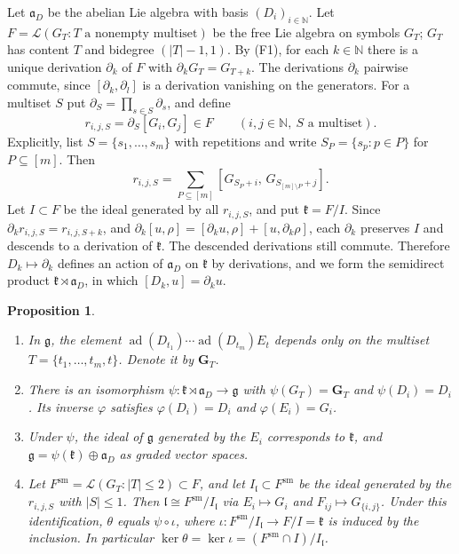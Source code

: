 \documentclass[11pt]{amsart}
\newtheorem{proposition}[theorem]{Proposition}
\theoremstyle{definition}
\theoremstyle{remark}
\newcommand{\N}{\mathbb{N}}
\newcommand{\g}{\mathfrak{g}}
\newcommand{\lie}{\mathfrak{l}}
\newcommand{\kr}{\mathfrak{k}}
\newcommand{\af}{\mathfrak{a}}
\newcommand{\Lf}{\mathcal{L}}
\newcommand{\ad}{\operatorname{ad}}
\begin{document}
Let $\af_D$ be the abelian Lie algebra with basis $(D_i)_{i\in\N}$. Let $F=\Lf(G_T: T\text{ a nonempty multiset})$ be the free Lie algebra on symbols $G_T$; $G_T$ has content $T$ and bidegree $(|T|-1,1)$. By (F1), for each $k\in\N$ there is a unique derivation $\partial_k$ of $F$ with $\partial_kG_T=G_{T+k}$. The derivations $\partial_k$ pairwise commute, since $[\partial_k,\partial_l]$ is a derivation vanishing on the generators. For a multiset $S$ put $\partial_S=\prod_{s\in S}\partial_s$, and define
\[
r_{i,j,S}=\partial_S[G_i,G_j]\in F\qquad(i,j\in\N,\ S\text{ a multiset}).
\]
Explicitly, list $S=\{s_1,\dots,s_m\}$ with repetitions and write $S_P=\{s_p:p\in P\}$ for $P\subseteq[m]$. Then
\begin{equation}\label{eq:r}
r_{i,j,S}=\sum_{P\subseteq[m]}[G_{S_P+i},\,G_{S_{[m]\setminus P}+j}].
\end{equation}
Let $I\subset F$ be the ideal generated by all $r_{i,j,S}$, and put $\kr=F/I$. Since $\partial_kr_{i,j,S}=r_{i,j,S+k}$, and $\partial_k[u,\rho]=[\partial_ku,\rho]+[u,\partial_k\rho]$, each $\partial_k$ preserves $I$ and descends to a derivation of $\kr$. The descended derivations still commute. Therefore $D_k\mapsto\partial_k$ defines an action of $\af_D$ on $\kr$ by derivations, and we form the semidirect product $\kr\rtimes\af_D$, in which $[D_k,u]=\partial_ku$.

\begin{proposition}\label{prop:k}
\begin{enumerate}
\item In $\g$, the element $\ad(D_{t_1})\cdots\ad(D_{t_{m}})E_t$ depends only on the multiset $T=\{t_1,\dots,t_m,t\}$. Denote it by $\mathbf G_T$.
\item There is an isomorphism $\psi\colon\kr\rtimes\af_D\to\g$ with $\psi(G_T)=\mathbf G_T$ and $\psi(D_i)=D_i$. Its inverse $\varphi$ satisfies $\varphi(D_i)=D_i$ and $\varphi(E_i)=G_i$.
\item Under $\psi$, the ideal of $\g$ generated by the $E_i$ corresponds to $\kr$, and $\g=\psi(\kr)\oplus\af_D$ as graded vector spaces.
\item Let $F^{\mathrm{sm}}=\Lf(G_T:|T|\le2)\subset F$, and let $I_{\lie}\subset F^{\mathrm{sm}}$ be the ideal generated by the $r_{i,j,S}$ with $|S|\le1$. Then $\lie\cong F^{\mathrm{sm}}/I_{\lie}$ via $E_i\mapsto G_i$ and $F_{ij}\mapsto G_{\{i,j\}}$. Under this identification, $\theta$ equals $\psi\circ\iota$, where $\iota\colon F^{\mathrm{sm}}/I_{\lie}\to F/I=\kr$ is induced by the inclusion. In particular $\ker\theta=\ker\iota=(F^{\mathrm{sm}}\cap I)/I_{\lie}$.
\end{enumerate}
\end{proposition}
\end{document}
